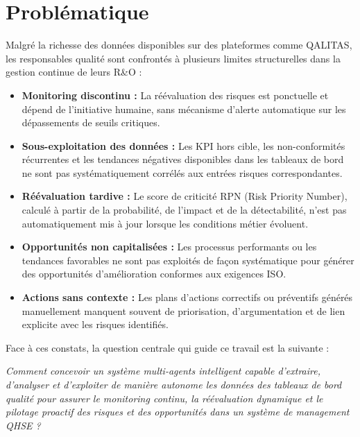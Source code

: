 \section*{Problématique}

Malgré la richesse des données disponibles sur des plateformes comme QALITAS, les responsables qualité sont confrontés à plusieurs limites structurelles dans la gestion continue de leurs R\&O :

\begin{itemize}
    \item \textbf{Monitoring discontinu :} La réévaluation des risques est ponctuelle et dépend de l'initiative humaine, sans mécanisme d'alerte automatique sur les dépassements de seuils critiques.

    \item \textbf{Sous-exploitation des données :} Les KPI hors cible, les non-conformités récurrentes et les tendances négatives disponibles dans les tableaux de bord ne sont pas systématiquement corrélés aux entrées risques correspondantes.

    \item \textbf{Réévaluation tardive :} Le score de criticité RPN (Risk Priority Number), calculé à partir de la probabilité, de l'impact et de la détectabilité, n'est pas automatiquement mis à jour lorsque les conditions métier évoluent.

    \item \textbf{Opportunités non capitalisées :} Les processus performants ou les tendances favorables ne sont pas exploités de façon systématique pour générer des opportunités d'amélioration conformes aux exigences ISO.

    \item \textbf{Actions sans contexte :} Les plans d'actions correctifs ou préventifs générés manuellement manquent souvent de priorisation, d'argumentation et de lien explicite avec les risques identifiés.
\end{itemize}

Face à ces constats, la question centrale qui guide ce travail est la suivante :

\begin{center}
\textit{Comment concevoir un système multi-agents intelligent capable d'extraire, d'analyser et d'exploiter de manière autonome les données des tableaux de bord qualité pour assurer le monitoring continu, la réévaluation dynamique et le pilotage proactif des risques et des opportunités dans un système de management QHSE ?}
\end{center}

